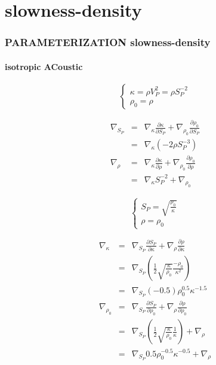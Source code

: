 \documentclass[9pt]{beamer}
\newcommand{\partderi}[2]{\frac{\partial#1}{\partial#2}}
\begin{document}
\section{slowness-density}

\begin{frame}\frametitle{PARAMETERIZATION slowness-density}
\framesubtitle{isotropic ACoustic}

  \begin{center}
  \end{center}
  
  \begin{minipage}{0.5\linewidth}
    \[\left\{ \begin{array}{l}
      \kappa = \rho V_P^2 = \rho S_P^{-2} \\
      \rho_0 = \rho 
    \end{array} \right.\]
    
    \begin{eqnarray}
      \nabla_{S_P} &=& \nabla_{\kappa} \partderi{\kappa}{S_P} + \nabla_{\rho_0} \partderi{\rho_0}{S_P} \nonumber\\
                   &=& \nabla_{\kappa} (-2\rho S_P^{-3})  \nonumber\\
      \nabla_{\rho} &=& \nabla_{\kappa} \partderi{\kappa}{\rho} + \nabla_{\rho_0} \partderi{\rho_0}{\rho} \nonumber\\
		    &=& \nabla_{\kappa} S_P^{-2} + \nabla_{\rho_0} \nonumber
    \end{eqnarray}

  \end{minipage} \vline
  \begin{minipage}{0.45\linewidth}
    \[\left\{ \begin{array}{l}
      S_P  = \sqrt{\frac{\rho_0}{\kappa}} \\
      \rho = \rho_0
    \end{array} \right.\]
    
    \begin{eqnarray}
      \nabla_{\kappa} &=& \nabla_{S_P} \partderi{S_P}{\kappa} + \nabla_{\rho} \partderi{\rho}{\kappa} \nonumber\\
                      &=& \nabla_{S_P} \left(\frac{1}{2}\sqrt{\frac{\kappa}{\rho_0}}\frac{-\rho_0}{\kappa^2}\right) \nonumber\\
                      &=& \nabla_{S_P} (-0.5)\rho_0^{0.5}\kappa^{-1.5} \nonumber\\
      \nabla_{\rho_0} &=& \nabla_{S_P} \partderi{S_P}{\rho_0} + \nabla_{\rho} \partderi{\rho}{\rho_0} \nonumber\\
                      &=& \nabla_{S_P} \left(\frac{1}{2}\sqrt{\frac{\kappa}{\rho_0}}\frac{1}{\kappa}\right) + \nabla_{\rho} \nonumber\\
                      &=& \nabla_{S_P} 0.5\rho_0^{-0.5}\kappa^{-0.5} + \nabla_{\rho} \nonumber
    \end{eqnarray}
  \end{minipage}

\end{frame}
\end{document}
